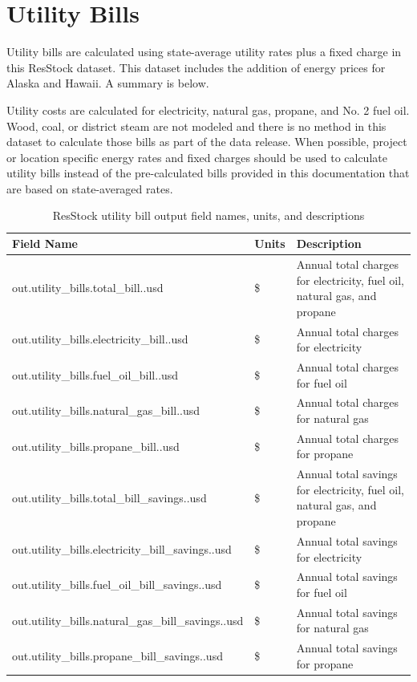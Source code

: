 \section{Utility Bills}
Utility bills are calculated using state-average utility rates plus a fixed charge in this ResStock dataset. This dataset includes the addition of energy prices for Alaska and Hawaii. A summary is below.

Utility costs are calculated for electricity, natural gas, propane, and No. 2 fuel oil. Wood, coal, or district steam are not modeled and there is no method in this dataset to calculate those bills as part of the data release. When possible, project or location specific energy rates and fixed charges should be used to calculate utility bills instead of the pre-calculated bills provided in this documentation that are based on state-averaged rates.

\begin{longtable}[]{ |p{5cm}|p{1.5cm}|p{7.5cm}| }
\caption{ResStock utility bill output field names, units, and descriptions} \label{table:utility_bill_outputs} \\
\toprule\noalign{}
\textbf{Field Name} & \textbf{Units} & \textbf{Description} \\
\midrule\noalign{}
\endhead
\bottomrule\noalign{}
\endlastfoot
        out.utility\_bills.total\_bill..usd & \$ & Annual total charges for electricity, fuel oil, natural gas, and propane \\ \hline
        out.utility\_bills.electricity\_bill..usd & \$ & Annual total charges for electricity \\ \hline
        out.utility\_bills.fuel\_oil\_bill..usd & \$ & Annual total charges for fuel oil \\ \hline
        out.utility\_bills.natural\_gas\_bill..usd & \$ & Annual total charges for natural gas \\ \hline
        out.utility\_bills.propane\_bill..usd & \$ & Annual total charges for propane \\ \hline
        out.utility\_bills.total\_bill\_savings..usd & \$ & Annual total savings for electricity, fuel oil, natural gas, and propane \\ \hline
        out.utility\_bills.electricity\_bill\_savings..usd & \$ & Annual total savings for electricity \\ \hline
        out.utility\_bills.fuel\_oil\_bill\_savings..usd & \$ & Annual total savings for fuel oil \\ \hline
        out.utility\_bills.natural\_gas\_bill\_savings..usd & \$ & Annual total savings for natural gas \\ \hline
        out.utility\_bills.propane\_bill\_savings..usd & \$ & Annual total savings for propane
\end{longtable}

